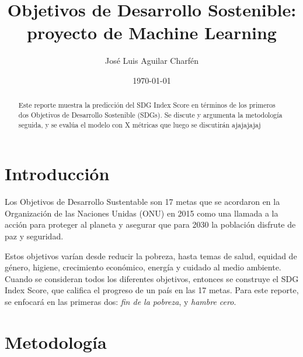 \documentclass[a4paper,12pt]{amsart}
\author{José Luis Aguilar Charfén}
\date{\today}
\title{Objetivos de Desarrollo Sostenible: proyecto de Machine Learning}
\begin{document}
    \begin{abstract} %
        Este reporte muestra la predicción del SDG Index Score en términos de 
        los primeros dos Objetivos de Desarrollo Sostenible (SDGs). Se discute 
        y argumenta la metodología seguida, y se evalúa el modelo con X métricas que luego se discutirán ajajajajaj
    \end{abstract}
    \maketitle

    \section{Introducción}

    Los Objetivos de Desarrollo Sustentable son 17 metas que se acordaron en la 
    Organización de las Naciones Unidas (ONU) en 2015 \cite{united_nations_development_programme_sustainable_nodate-1}
    como una llamada a la acción para proteger al planeta y asegurar que para
    2030 la población disfrute de paz y seguridad. 

    Estos objetivos varían desde reducir la pobreza, hasta temas de salud, 
    equidad de género, higiene, crecimiento económico, energía y cuidado al medio ambiente. 
    Cuando se consideran todos los diferentes objetivos, entonces se construye el 
    SDG Index Score, que califica el progreso de un país en las 17 metas. Para 
    este reporte, se enfocará en las primeras dos: \emph{fin de la pobreza}, y \emph{hambre cero}.

    		
    \section{Metodología}
\end{document}
